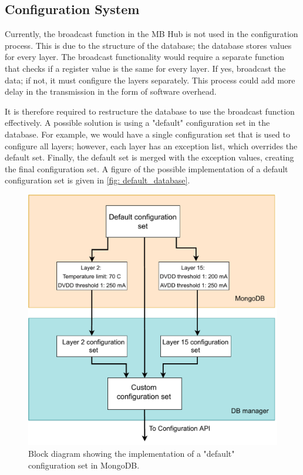 \documentclass[main.tex]{subfiles}
\begin{document}
\subsection{Configuration System}

Currently, the broadcast function in the MB Hub is not used in the configuration process. This is due to the structure of the database; the database stores values for every layer. The broadcast functionality would require a separate function that checks if a register value is the same for every layer. If yes, broadcast the data; if not, it must configure the layers separately. This process could add more delay in the transmission in the form of software overhead.

It is therefore required to restructure the database to use the broadcast function effectively. A possible solution is using a "default" configuration set in the database. For example, we would have a single configuration set that is used to configure all layers; however, each layer has an exception list, which overrides the default set. Finally, the default set is merged with the exception values, creating the final configuration set. A figure of the possible implementation of a default configuration set is given in \autoref{fig: default_database}.


\begin{figure}[!ht]
    \centering
    \includegraphics[scale=0.55]{images/default_database.pdf}
    \caption{Block diagram showing the implementation of a "default" configuration set in MongoDB.}
    \label{fig: default_database}
\end{figure}
\FloatBarrier 
\end{document}
